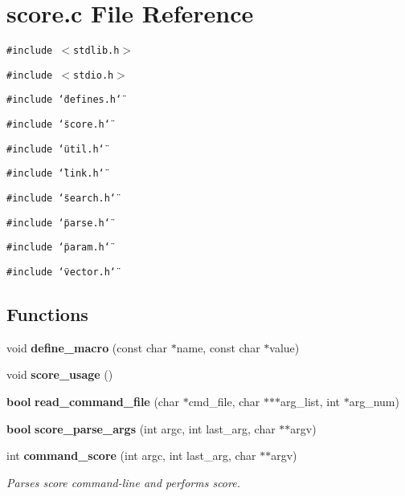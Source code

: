 \section{score.c File Reference}
\label{score_8c}
{\tt \#include $<$stdlib.h$>$}\par
{\tt \#include $<$stdio.h$>$}\par
{\tt \#include \char`\"{}defines.h\char`\"{}}\par
{\tt \#include \char`\"{}score.h\char`\"{}}\par
{\tt \#include \char`\"{}util.h\char`\"{}}\par
{\tt \#include \char`\"{}link.h\char`\"{}}\par
{\tt \#include \char`\"{}search.h\char`\"{}}\par
{\tt \#include \char`\"{}parse.h\char`\"{}}\par
{\tt \#include \char`\"{}param.h\char`\"{}}\par
{\tt \#include \char`\"{}vector.h\char`\"{}}\par
\subsection*{Functions}
\begin{CompactItemize}
\item 
void {\bf define\_\-macro} (const char $\ast$name, const char $\ast$value)
\item 
void {\bf score\_\-usage} ()
\item 
{\bf bool} {\bf read\_\-command\_\-file} (char $\ast$cmd\_\-file, char $\ast$$\ast$$\ast$arg\_\-list, int $\ast$arg\_\-num)
\item 
{\bf bool} {\bf score\_\-parse\_\-args} (int argc, int last\_\-arg, char $\ast$$\ast$argv)
\item 
int {\bf command\_\-score} (int argc, int last\_\-arg, char $\ast$$\ast$argv)
\begin{CompactList}\small\item\em Parses score command-line and performs score.\item\end{CompactList}\end{CompactItemize}
